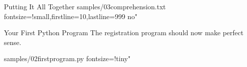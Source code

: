 \documentclass[reference]{pyslides}
\begin{document}
\begin{frame}[fragile]{Putting It All Together}
 samples/03comprehension.txt fontsize=!small,firstline=10,lastline=999 no"
\end{frame}

\begin{frame}[fragile]{Your First Python Program}
The registration program should now make perfect sense.

\bigskip

 samples/02firstprogram.py fontsize=!tiny"

\bigskip
\end{frame}
\end{document}
